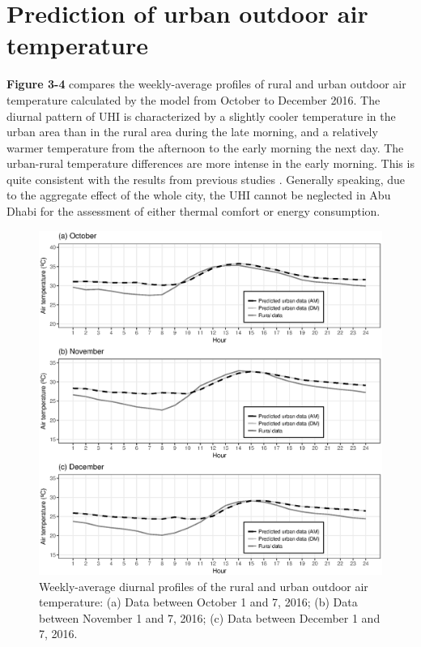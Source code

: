 \section{Prediction of urban outdoor air temperature}

\textbf{Figure 3-4} compares the weekly-average profiles of rural and urban outdoor air temperature calculated by the model from October to December 2016. The diurnal pattern of UHI is characterized by a slightly cooler temperature in the urban area than in the rural area during the late morning, and a relatively warmer temperature from the afternoon to the early morning the next day. The urban-rural temperature differences are more intense in the early morning. This is quite consistent with the results from previous studies \cite{bueno2013urban,bueno2014computationally,oke2002boundary}. Generally speaking, due to the aggregate effect of the whole city, the UHI cannot be neglected in Abu Dhabi for the assessment of either thermal comfort or energy consumption.

\begin{figure}
\centering
\includegraphics[width=.8\linewidth]{Figure3-4.eps}
\caption{Weekly-average diurnal profiles of the rural and urban outdoor air temperature: (a) Data between October 1 and 7, 2016; (b) Data between November 1 and 7, 2016; (c) Data between December 1 and 7, 2016.}
\end{figure}

